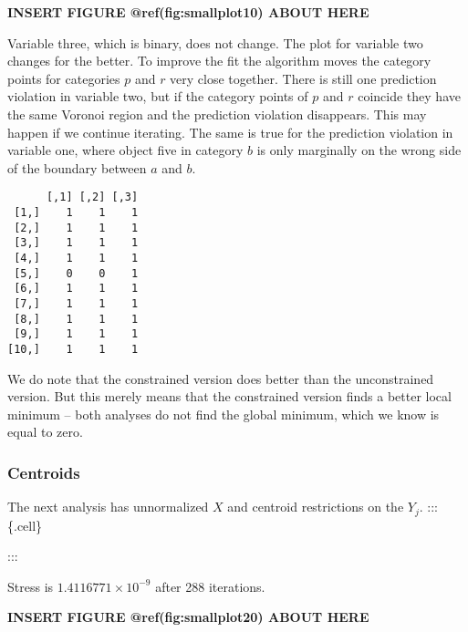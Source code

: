\documentclass[
  12pt,
  letterpaper,
  DIV=11,
  numbers=noendperiod]{scrartcl}
\begin{document}
\begin{greybox}

\begin{center}
\textbf{INSERT FIGURE @ref(fig:smallplot10) ABOUT HERE}

\end{center}

\end{greybox}

Variable three, which is binary, does not change. The plot for variable
two changes for the better. To improve the fit the algorithm moves the
category points for categories \(p\) and \(r\) very close together.
There is still one prediction violation in variable two, but if the
category points of \(p\) and \(r\) coincide they have the same Voronoi
region and the prediction violation disappears. This may happen if we
continue iterating. The same is true for the prediction violation in
variable one, where object five in category \(b\) is only marginally on
the wrong side of the boundary between \(a\) and \(b\).

\begin{verbatim}
      [,1] [,2] [,3]
 [1,]    1    1    1
 [2,]    1    1    1
 [3,]    1    1    1
 [4,]    1    1    1
 [5,]    0    0    1
 [6,]    1    1    1
 [7,]    1    1    1
 [8,]    1    1    1
 [9,]    1    1    1
[10,]    1    1    1
\end{verbatim}

We do note that the constrained version does better than the
unconstrained version. But this merely means that the constrained
version finds a better local minimum -- both analyses do not find the
global minimum, which we know is equal to zero.

\subsubsection{Centroids}\label{centroids}

The next analysis has unnormalized \(X\) and centroid restrictions on
the \(Y_j\). ::: \{.cell\}

:::

Stress is \ensuremath{1.4116771\times 10^{-9}} after 288 iterations.

\begin{greybox}

\begin{center}
\textbf{INSERT FIGURE @ref(fig:smallplot20) ABOUT HERE}

\end{center}

\end{greybox}
\end{document}
